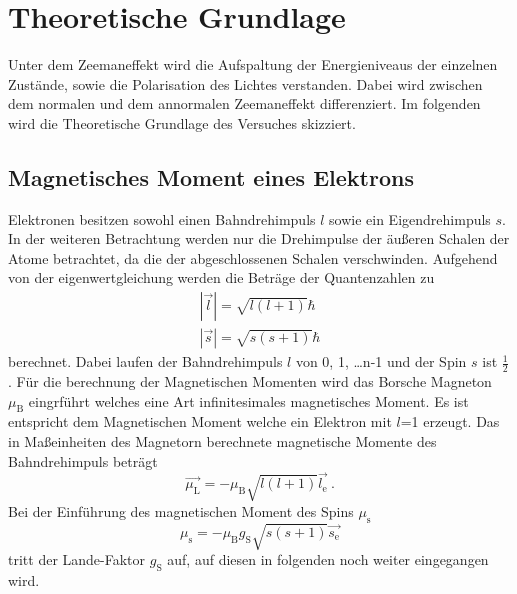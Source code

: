 \section{Theoretische Grundlage}
\label{sec:Theorie}
Unter dem Zeemaneffekt wird die Aufspaltung der Energieniveaus der einzelnen Zustände, sowie die Polarisation des Lichtes verstanden. Dabei wird zwischen dem normalen und dem annormalen Zeemaneffekt differenziert. Im folgenden wird die Theoretische Grundlage des Versuches skizziert.

\subsection{Magnetisches Moment eines Elektrons}
Elektronen besitzen sowohl einen Bahndrehimpuls $l$ sowie ein Eigendrehimpuls $s$. In der weiteren Betrachtung werden nur die Drehimpulse der äußeren Schalen der Atome betrachtet, da die der abgeschlossenen Schalen verschwinden. Aufgehend von der eigenwertgleichung werden die Beträge der Quantenzahlen zu 
\begin{eqnarray}
  |\vec{l}| = \sqrt{l(l+1)} \hbar  \\  
  |\vec{s}| = \sqrt{s(s+1)} \hbar
  \label{eqn:betQua}
\end{eqnarray}
berechnet. Dabei laufen der Bahndrehimpuls $l$ von 0, 1, \ldots n-1 und der Spin $s$ ist $\frac{1}{2}$. Für die berechnung der Magnetischen Momenten wird das Borsche Magneton $\mu_\text{B}$ eingrführt welches eine Art infinitesimales magnetisches Moment. Es ist entspricht dem Magnetischen Moment welche ein Elektron mit $l$=1 erzeugt. Das in Maßeinheiten des Magnetorn berechnete magnetische Momente des Bahndrehimpuls beträgt
\begin{equation}
  \vec{\mu_\text{L}} = -\mu_\text{B} \sqrt{l(l+1)} \vec{l_\text{e}} \ .
  \label{eqn:magL}
\end{equation}
Bei der Einführung des magnetischen Moment des Spins $\mu_\text{s}$ 
\begin{equation}
  \mu_\text{s} = - \mu_\text{B} g_\text{S} \sqrt{s(s+1)} \vec{s_\text{e}}
  \label{eqn:magS}
\end{equation}
tritt der Lande-Faktor $g_\text{S}$ auf, auf diesen in folgenden noch weiter eingegangen wird.

